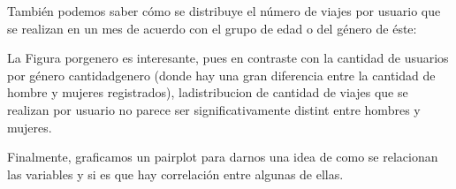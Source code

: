 \documentclass[letterpaper,spanish,reprint,nofootinbib,showkeys,aps]{revtex4-2}
\begin{document}

También podemos saber cómo se distribuye el número de viajes por usuario que se realizan en un mes de acuerdo 
con el grupo de edad o del género de éste:



La Figura {porgenero} es interesante, pues en contraste con la cantidad de usuarios por género {cantidadgenero} (donde 
hay una gran diferencia entre la cantidad de hombre y mujeres registrados), ladistribucion de cantidad de viajes que se realizan por usuario 
no parece ser significativamente distint entre hombres y mujeres.



Finalmente, graficamos un pairplot para darnos una idea de como se relacionan las variables 
y si es que hay correlación entre algunas de ellas.


\end{document}
